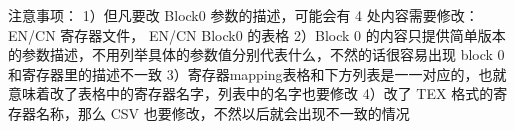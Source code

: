 注意事项：
1）但凡要改 Block0 参数的描述，可能会有 4 处内容需要修改：EN/CN 寄存器文件， EN/CN Block0 的表格
2）Block 0 的内容只提供简单版本的参数描述，不用列举具体的参数值分别代表什么，不然的话很容易出现 block 0 和寄存器里的描述不一致
3）寄存器mapping表格和下方列表是一一对应的，也就意味着改了表格中的寄存器名字，列表中的名字也要修改
4）改了 TEX 格式的寄存器名称，那么 CSV 也要修改，不然以后就会出现不一致的情况